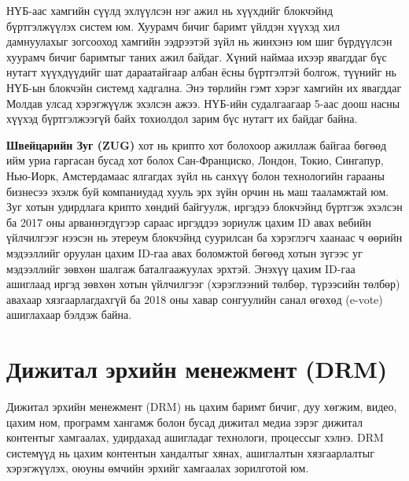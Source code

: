 НҮБ-аас хамгийн сүүлд эхлүүлсэн нэг ажил нь хүүхдийг блокчэйнд
бүртгэлжүүлэх систем юм. Хуурамч бичиг баримт үйлдэн хүүхэд хил
дамнуулахыг зогсооход хамгийн ээдрээтэй зүйл нь жинхэнэ юм шиг
бүрдүүлсэн хуурамч бичиг баримтыг таних ажил байдаг. Хүний наймаа ихээр явагддаг бүс нутагт хүүхдүүдийг шат дараатайгаар албан ёсны бүртгэлтэй болгож, түүнийг нь НҮБ-ын блокчэйн системд хадгална. Энэ төрлийн гэмт хэрэг хамгийн их явагддаг Молдав улсад хэрэгжүүлж эхэлсэн ажээ. НҮБ-ийн судалгаагаар 5-аас доош насны хүүхэд бүртгэлжээгүй байх тохиолдол зарим
бүс нутагт их байдаг байна.

\textbf{Швейцарийн Зуг (ZUG)} хот нь крипто хот болохоор ажиллаж
байгаа бөгөөд ийм уриа гаргасан бусад хот болох Сан-Франциско, Лондон, Токио, Сингапур, Нью-Иорк, Амстердамаас ялгагдах зүйл нь санхүү болон технологийн гарааны бизнесээ эхэлж буй компаниудад хууль эрх зүйн орчин нь маш тааламжтай юм. Зуг хотын удирдлага крипто хөндий байгуулж, иргэдээ блокчэйнд бүртгэж эхэлсэн ба 2017 оны арваннэгдүгээр сараас иргэддээ зориулж цахим ID авах вебийн үйлчилгээг нээсэн нь этереум
блокчэйнд суурилсан ба хэрэглэгч хаанаас ч өөрийн мэдээллийг оруулан цахим ID-гаа авах боломжтой бөгөөд хотын зүгээс уг мэдээллийг зөвхөн шалгаж баталгаажуулах эрхтэй. Энэхүү цахим ID-гаа ашиглаад иргэд зөвхөн хотын үйлчилгээг (хэрэглээний төлбөр, түрээсийн төлбөр) авахаар хязгаарлагдахгүй ба 2018 оны хавар сонгуулийн санал өгөхөд (e-vote) ашиглахаар бэлдэж байна.

\section{Дижитал эрхийн менежмент (DRM)}
Дижитал эрхийн менежмент (DRM) нь цахим баримт бичиг, дуу хөгжим, видео, цахим ном, программ хангамж болон бусад дижитал медиа зэрэг дижитал контентыг хамгаалах, удирдахад ашигладаг технологи, процессыг хэлнэ. DRM системүүд нь цахим контентын хандалтыг хянах, ашиглалтын хязгаарлалтыг хэрэгжүүлэх, оюуны өмчийн эрхийг хамгаалах зорилготой юм.

